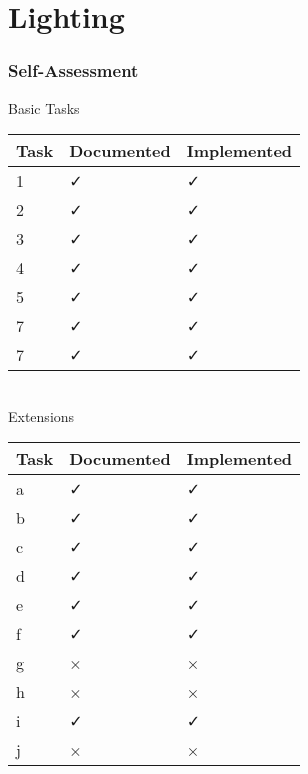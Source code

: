 \documentclass[titlepage]{article}
\begin{document}
\section{Lighting}


        \clearpage
        \subsubsection{Self-Assessment}
        Basic Tasks \\
        \vspace{1em}
        \begin{tabularx}{\columnwidth}{| X | X | X |}
            \hline
            Task & Documented & Implemented \\
            \hline
            1 & ✓ & ✓ \\
            \hline
            2 & ✓ & ✓ \\
            \hline
            3 & ✓ & ✓ \\
            \hline
            4 & ✓ & ✓ \\
            \hline
            5 & ✓ & ✓ \\
            \hline
            7 & ✓ & ✓ \\
            \hline
            7 & ✓ & ✓ \\
            \hline
        \end{tabularx} \\

        Extensions \\
        \vspace{1em}
        \begin{tabularx}{\columnwidth}{| X | X | X |}
            \hline
            Task & Documented & Implemented \\
            \hline
            a & ✓ & ✓ \\
            \hline
            b & ✓ & ✓ \\
            \hline
            c & ✓ & ✓ \\
            \hline
            d & ✓ & ✓ \\
            \hline
            e & ✓ & ✓ \\
            \hline
            f & ✓ & ✓ \\
            \hline
            g & × & × \\
            \hline
            h & × & × \\
            \hline
            i & ✓ & ✓ \\
            \hline
            j & × & × \\
            \hline
        \end{tabularx} \\
\end{document}
